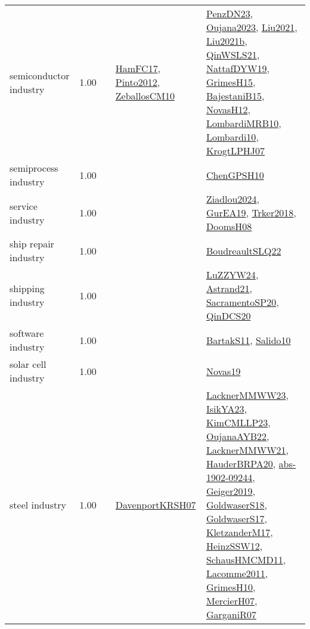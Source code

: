 {\begin{longtable}{p{3cm}r>{\raggedright\arraybackslash}p{6cm}>{\raggedright\arraybackslash}p{6cm}>{\raggedright\arraybackslash}p{8cm}}
\index{semiconductor industry}\index{Industries!semiconductor industry}semiconductor industry &  1.00 &  & \hyperref[detail:HamFC17]{HamFC17}, \hyperref[detail:Pinto2012]{Pinto2012}, \hyperref[detail:ZeballosCM10]{ZeballosCM10} & \hyperref[detail:PenzDN23]{PenzDN23}, \hyperref[detail:Oujana2023]{Oujana2023}, \hyperref[detail:Liu2021]{Liu2021}, \hyperref[detail:Liu2021b]{Liu2021b}, \hyperref[detail:QinWSLS21]{QinWSLS21}, \hyperref[detail:NattafDYW19]{NattafDYW19}, \hyperref[detail:GrimesH15]{GrimesH15}, \hyperref[detail:BajestaniB15]{BajestaniB15}, \hyperref[detail:NovasH12]{NovasH12}, \hyperref[detail:LombardiMRB10]{LombardiMRB10}, \hyperref[detail:Lombardi10]{Lombardi10}, \hyperref[detail:KrogtLPHJ07]{KrogtLPHJ07}\\
\index{semiprocess industry}\index{Industries!semiprocess industry}semiprocess industry &  1.00 &  &  & \hyperref[detail:ChenGPSH10]{ChenGPSH10}\\
\index{service industry}\index{Industries!service industry}service industry &  1.00 &  &  & \hyperref[detail:Ziadlou2024]{Ziadlou2024}, \hyperref[detail:GurEA19]{GurEA19}, \hyperref[detail:Trker2018]{Trker2018}, \hyperref[detail:DoomsH08]{DoomsH08}\\
\index{ship repair industry}\index{Industries!ship repair industry}ship repair industry &  1.00 &  &  & \hyperref[detail:BoudreaultSLQ22]{BoudreaultSLQ22}\\
\index{shipping industry}\index{Industries!shipping industry}shipping industry &  1.00 &  &  & \hyperref[detail:LuZZYW24]{LuZZYW24}, \hyperref[detail:Astrand21]{Astrand21}, \hyperref[detail:SacramentoSP20]{SacramentoSP20}, \hyperref[detail:QinDCS20]{QinDCS20}\\
\index{software industry}\index{Industries!software industry}software industry &  1.00 &  &  & \hyperref[detail:BartakS11]{BartakS11}, \hyperref[detail:Salido10]{Salido10}\\
\index{solar cell industry}\index{Industries!solar cell industry}solar cell industry &  1.00 &  &  & \hyperref[detail:Novas19]{Novas19}\\
\index{steel industry}\index{Industries!steel industry}steel industry &  1.00 &  & \hyperref[detail:DavenportKRSH07]{DavenportKRSH07} & \hyperref[detail:LacknerMMWW23]{LacknerMMWW23}, \hyperref[detail:IsikYA23]{IsikYA23}, \hyperref[detail:KimCMLLP23]{KimCMLLP23}, \hyperref[detail:OujanaAYB22]{OujanaAYB22}, \hyperref[detail:LacknerMMWW21]{LacknerMMWW21}, \hyperref[detail:HauderBRPA20]{HauderBRPA20}, \hyperref[detail:abs-1902-09244]{abs-1902-09244}, \hyperref[detail:Geiger2019]{Geiger2019}, \hyperref[detail:GoldwaserS18]{GoldwaserS18}, \hyperref[detail:GoldwaserS17]{GoldwaserS17}, \hyperref[detail:KletzanderM17]{KletzanderM17}, \hyperref[detail:HeinzSSW12]{HeinzSSW12}, \hyperref[detail:SchausHMCMD11]{SchausHMCMD11}, \hyperref[detail:Lacomme2011]{Lacomme2011}, \hyperref[detail:GrimesH10]{GrimesH10}, \hyperref[detail:MercierH07]{MercierH07}, \hyperref[detail:GarganiR07]{GarganiR07}\\

\end{longtable}}
